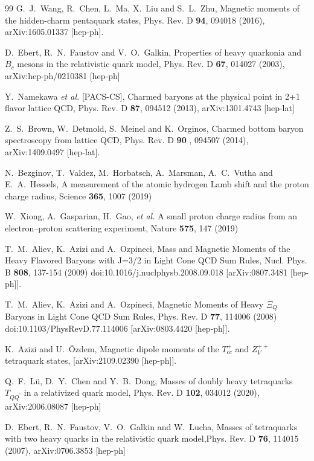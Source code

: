 \documentclass[12pt,prd,onecolumn,floatfix,nofootinbib]{revtex4}
\begin{document}
\begin{thebibliography}{99}
 G.~J.~Wang, R.~Chen, L.~Ma, X.~Liu and S.~L.~Zhu,
Magnetic moments of the hidden-charm pentaquark states, Phys. Rev. D \textbf{%
94}, 094018 (2016), arXiv:1605.01337 [hep-ph].

 D.~Ebert, R.~N.~Faustov and V.~O.~Galkin, Properties
of heavy quarkonia and $B_{c}$ mesons in the relativistic quark model, Phys.
Rev. D \textbf{67}, 014027 (2003), arXiv:hep-ph/0210381 [hep-ph]

 Y.~Namekawa \textit{et al.} [PACS-CS], Charmed
baryons at the physical point in 2+1 flavor lattice QCD, Phys. Rev. D
\textbf{87}, 094512 (2013), arXiv:1301.4743 [hep-lat]

 Z.~S.~Brown, W.~Detmold, S.~Meinel and K.~Orginos,
Charmed bottom baryon spectroscopy from lattice QCD, Phys. Rev. D \textbf{90}%
, 094507 (2014), arXiv:1409.0497 [hep-lat].

 N.~Bezginov, T.~Valdez, M.~Horbatsch, A.~Marsman,
A.~C.~Vutha and E.~A.~Hessels, A measurement of the atomic hydrogen Lamb
shift and the proton charge radius, Science \textbf{365}, 1007 (2019)

 W.~Xiong, A.~Gasparian, H.~Gao, \textit{et al.} A
small proton charge radius from an electron--{}proton scattering experiment,
Nature \textbf{575}, 147 (2019)

 T.~M.~Aliev, K.~Azizi and A.~Ozpineci, Mass and Magnetic 
Moments of the Heavy Flavored Baryons with J=3/2 in Light Cone QCD Sum Rules, 
Nucl. Phys. B \textbf{808}, 137-154 (2009) doi:10.1016/j.nuclphysb.2008.09.018
[arXiv:0807.3481 [hep-ph]].

 T.~M.~Aliev, K.~Azizi and A.~Ozpineci, Magnetic Moments 
of Heavy $\Xi_{Q}$ Baryons in Light Cone QCD Sum Rules, Phys. Rev. D \textbf{77}, 
114006 (2008) doi:10.1103/PhysRevD.77.114006 [arXiv:0803.4420 [hep-ph]].

 K.~Azizi and U.~\"Ozdem, Magnetic dipole moments of 
the $T_{cc}^+$ and $Z_V^{++}$ tetraquark states, [arXiv:2109.02390 [hep-ph]].

 Q.~F.~L\"{u}, D.~Y.~Chen and Y.~B.~Dong, Masses of
doubly heavy tetraquarks $T_{QQ^{\prime }}$ in a relativized quark model,
Phys. Rev. D \textbf{102}, 034012 (2020), arXiv:2006.08087 [hep-ph]

 D.~Ebert, R.~N.~Faustov, V.~O.~Galkin and W.~Lucha,
Masses of tetraquarks with two heavy quarks in the relativistic quark
model,Phys. Rev. D \textbf{76}, 114015 (2007), arXiv:0706.3853 [hep-ph]



\end{thebibliography}
\end{document}
